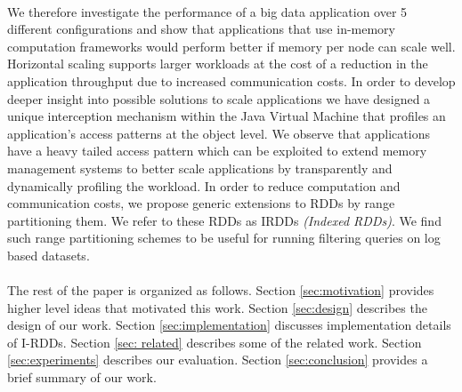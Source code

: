\paragraph{}
	We therefore investigate the performance of a big data application over 5 different configurations and show that applications that use in-memory computation frameworks would perform better if memory per node can scale well. Horizontal scaling supports larger workloads at the cost of a reduction in the application throughput due to increased communication costs. In order to develop deeper insight into possible solutions to scale applications we have designed a unique interception mechanism within the Java Virtual Machine that profiles an application’s access patterns at the object level. We observe that applications have a heavy tailed access pattern which can be exploited to extend  memory management systems to better scale applications by transparently and dynamically profiling the workload.  In order to reduce computation and communication costs, we propose generic extensions to RDDs by range partitioning them. We refer to these RDDs as IRDDs \textit{(Indexed RDDs)}. We find such range partitioning schemes to be useful for running filtering queries on log based datasets.
\paragraph{}
	The rest of the paper is organized as follows. Section \ref{sec:motivation} provides higher level ideas that motivated this work. Section \ref{sec:design} describes the design of our work.  Section \ref{sec:implementation} discusses implementation details of I-RDDs. Section \ref{sec: related} describes some of the related work. Section \ref{sec:experiments} describes our evaluation. Section \ref{sec:conclusion} provides a brief summary of our work.
